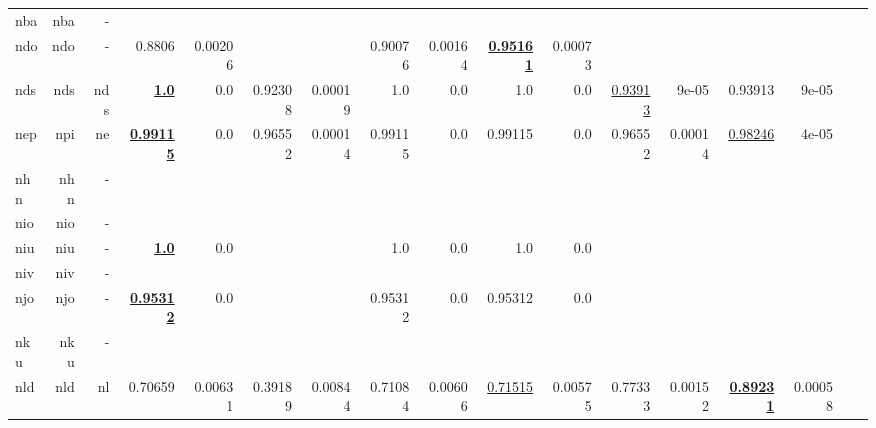 \documentclass[11pt]{article}
\begin{document}
\begin{table*}[h]
{\begin{tabular}{lrrrrrrrrrrrrrrrr}
nba         & nba         & -         &          &          &          &          &          &          &          &          &          &          &          &          \\
ndo         & ndo         & -         & 0.8806         & 0.00206         &          &          & 0.90076         & 0.00164         & \textbf{\underline{0.95161}}         & 0.00073         &          &          &          &          \\
nds         & nds         & nds         & \textbf{\underline{1.0}}         & 0.0         & 0.92308         & 0.00019         & 1.0         & 0.0         & 1.0         & 0.0         & \underline{0.93913}         & 9e-05         & 0.93913         & 9e-05         \\
nep         & npi         & ne         & \textbf{\underline{0.99115}}         & 0.0         & 0.96552         & 0.00014         & 0.99115         & 0.0         & 0.99115         & 0.0         & 0.96552         & 0.00014         & \underline{0.98246}         & 4e-05         \\
nhn         & nhn         & -         &          &          &          &          &          &          &          &          &          &          &          &          \\
nio         & nio         & -         &          &          &          &          &          &          &          &          &          &          &          &          \\
niu         & niu         & -         & \textbf{\underline{1.0}}         & 0.0         &          &          & 1.0         & 0.0         & 1.0         & 0.0         &          &          &          &          \\
niv         & niv         & -         &          &          &          &          &          &          &          &          &          &          &          &          \\
njo         & njo         & -         & \textbf{\underline{0.95312}}         & 0.0         &          &          & 0.95312         & 0.0         & 0.95312         & 0.0         &          &          &          &          \\
nku         & nku         & -         &          &          &          &          &          &          &          &          &          &          &          &          \\
nld         & nld         & nl         & 0.70659         & 0.00631         & 0.39189         & 0.00844         & 0.71084         & 0.00606         & \underline{0.71515}         & 0.00575         & 0.77333         & 0.00152         & \textbf{\underline{0.89231}}         & 0.00058         \\

\end{tabular}}
\end{table*}
\end{document}
